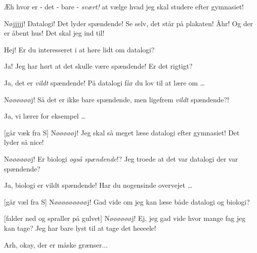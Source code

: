 \documentclass[a4paper,11pt]{article}
\begin{document}
\begin{sketch}



 Æh hvor er - det - bare - \emph{svært!} at vælge hvad jeg skal studere efter gymnasiet!


 Nøjjjjj! Datalogi! Det lyder spændende! Se selv, det står på plakaten! Åhr! Og der er åbent hus! Det skal jeg ind til!


 Hej! Er du interesseret i at høre lidt om datalogi?

 Ja! Jeg har hørt at det skulle være spændende! Er det rigtigt?

 Ja, det er \emph{vildt} spændende! På datalogi får du lov til at lære om \ldots

 Nøøøøøøj! Så det er ikke bare spændende, men ligefrem \emph{vildt} spændende?!

 Ja, vi lærer for eksempel \ldots

[går væk fra S] Nøøøøøj! Jeg skal så meget læse datalogi efter gymnasiet! Det lyder så nice!


 Nøøøøøøj! Er biologi \emph{også} \emph{spændende}!?  Jeg troede at det var datalogi der var spændende?

 Ja, biologi er vildt spændende! Har du nogensinde overvejet \ldots

[går væl fra S] Nøøøøøøøøøj! Gad vide om jeg kan læse både datalogi og biologi?


[falder ned og spraller på gulvet] Nøøøøøøj! Ej, jeg gad vide hvor mange fag jeg kan tage? Jeg har bare lyst til at tage det heeeele!


 Arh, okay, der er måske grænser...


\end{sketch}
\end{document}
